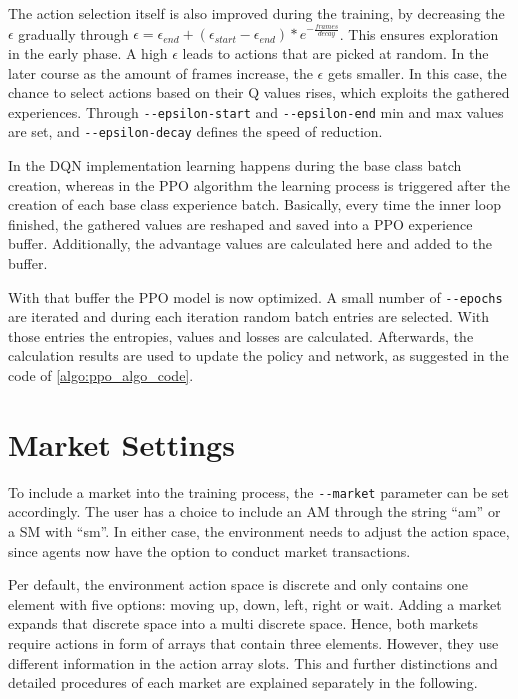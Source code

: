 The action selection itself is also improved during the training, by decreasing the $\epsilon$ gradually through $\epsilon = \epsilon_{end}+(\epsilon_{start}-\epsilon_{end})*e^{-\frac{frames}{decay}}$. This ensures exploration in the early phase. A high $\epsilon$ leads to actions that are picked at random. In the later course as the amount of frames increase, the $\epsilon$ gets smaller. In this case, the chance to select actions based on their Q values rises, which exploits the gathered experiences. Through \verb|--epsilon-start| and \verb|--epsilon-end| min and max values are set, and \verb|--epsilon-decay| defines the speed of reduction.

In the DQN implementation learning happens during the base class batch creation, whereas in the PPO algorithm the learning process is triggered after the creation of each base class experience batch. Basically, every time the inner loop finished, the gathered values are reshaped and saved into a PPO experience buffer. Additionally, the advantage values are calculated here and added to the buffer.

With that buffer the PPO model is now optimized. A small number of \verb|--epochs| are iterated and during each iteration random batch entries are selected. With those entries the entropies, values and losses are calculated. Afterwards, the calculation results are used to update the policy and network, as suggested in the code of \ref{algo:ppo_algo_code}.

\section{Market Settings}\label{market_settings}
To include a market into the training process, the \verb|--market| parameter can be set accordingly. The user has a choice to include an AM through the string ``am'' or a SM with ``sm''. In either case, the environment needs to adjust the action space, since agents now have the option to conduct market transactions.

Per default, the environment action space is discrete and only contains one element with five options: moving up, down, left, right or wait. Adding a market expands that discrete space into a multi discrete space. Hence, both markets require actions in form of arrays that contain three elements. However, they use different information in the action array slots. This and further distinctions and detailed procedures of each market are explained separately in the following.

